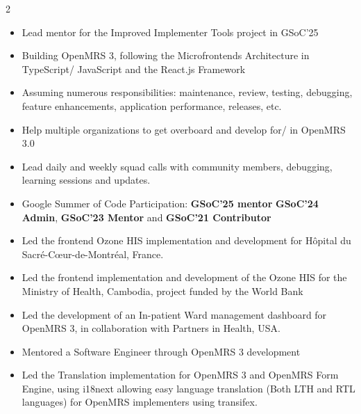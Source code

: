 \documentclass[8pt,a4paper,normalphoto]{altacv}
\begin{document}
\begin{paracol}{2}
\begin{itemize}
% 
\end{itemize}


\medskip

\begin{itemize}
 \item Lead mentor for the Improved Implementer Tools project in GSoC'25
 \item Building OpenMRS 3, following the Microfrontends Architecture in TypeScript/ JavaScript and the React.js Framework
 \item Assuming numerous responsibilities: maintenance, review, testing, debugging, feature enhancements, application performance, releases, etc. 
 \item Help multiple organizations to get overboard and develop for/ in OpenMRS 3.0
 \item Lead daily and weekly squad calls with community members, debugging, learning sessions and updates.
 \item Google Summer of Code Participation: \textbf{GSoC'25 mentor} \textbf{GSoC'24 Admin}, \textbf{GSoC'23 Mentor} and \textbf{GSoC'21 Contributor}
\end{itemize}


\medskip

\begin{itemize}
\item Led the frontend Ozone HIS implementation and development for Hôpital du Sacré-Cœur-de-Montréal, France.
\item Led the frontend implementation and development of the Ozone HIS for the Ministry of Health, Cambodia, project funded by the World Bank
\item Led the development of an In-patient Ward management dashboard for OpenMRS 3, in collaboration with Partners in Health, USA.
\item Mentored a Software Engineer through OpenMRS 3 development 
\item Led the Translation implementation for OpenMRS 3 and OpenMRS Form Engine, using i18next allowing easy language translation (Both LTH and RTL languages) for OpenMRS implementers using transifex.
\end{itemize}


\end{paracol}
\end{document}
